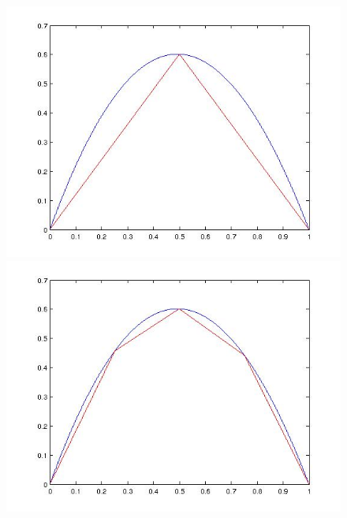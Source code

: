 \documentclass[a4paper]{article}
\begin{document}
\begin{figure}[h]
\begin{minipage}[t][5cm][b]{0,5\textwidth} 
  \includegraphics[width=\textwidth]{n_2__0_1555.jpg} 
  \end{minipage}
  \begin{minipage}[t][5cm][b]{0,5\textwidth}
  \includegraphics[width=\textwidth]{n_4__0_0390.jpg}
  \end{minipage} 
  \begin{minipage}[t][5cm][b]{0,5\textwidth}

\end{minipage}
\end{figure}
\end{document}
